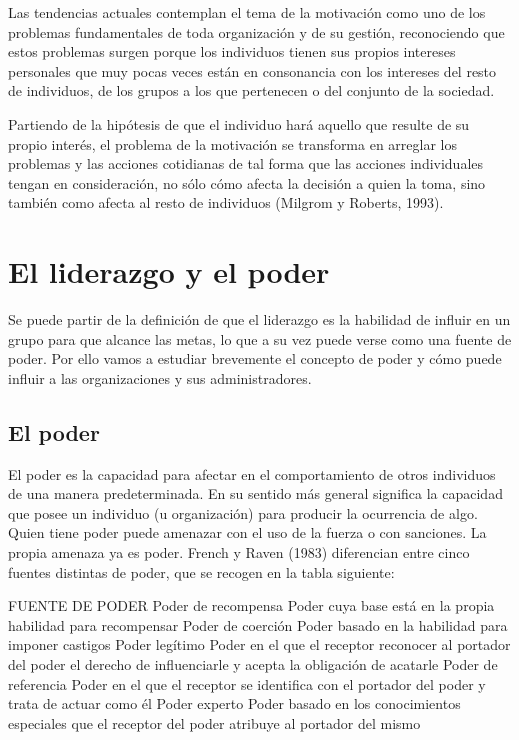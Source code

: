 \documentclass[
]{krantz}
\begin{document}
Las tendencias actuales contemplan el tema de la motivación como uno de los problemas fundamentales de toda organización y de su gestión, reconociendo que estos problemas surgen porque los individuos tienen sus propios intereses personales que muy pocas veces están en consonancia con los intereses del resto de individuos, de los grupos a los que pertenecen o del conjunto de la sociedad.

Partiendo de la hipótesis de que el individuo hará aquello que resulte de su propio interés, el problema de la motivación se transforma en arreglar los problemas y las acciones cotidianas de tal forma que las acciones individuales tengan en consideración, no sólo cómo afecta la decisión a quien la toma, sino también como afecta al resto de individuos (Milgrom y Roberts, 1993).

\hypertarget{el-liderazgo-y-el-poder}{%
\section{El liderazgo y el poder}\label{el-liderazgo-y-el-poder}}

Se puede partir de la definición de que el liderazgo es la habilidad de influir en un grupo para que alcance las metas, lo que a su vez puede verse como una fuente de poder. Por ello vamos a estudiar brevemente el concepto de poder y cómo puede influir a las organizaciones y sus administradores.

\hypertarget{el-poder}{%
\subsection{El poder}\label{el-poder}}

El poder es la capacidad para afectar en el comportamiento de otros individuos de una manera predeterminada. En su sentido más general significa la capacidad que posee un individuo (u organización) para producir la ocurrencia de algo. Quien tiene poder puede amenazar con el uso de la fuerza o con sanciones. La propia amenaza ya es poder.
French y Raven (1983) diferencian entre cinco fuentes distintas de poder, que se recogen en la tabla siguiente:

FUENTE DE PODER
Poder de recompensa Poder cuya base está en la propia habilidad para recompensar
Poder de coerción Poder basado en la habilidad para imponer castigos
Poder legítimo Poder en el que el receptor reconocer al portador del poder el derecho de influenciarle y acepta la obligación de acatarle
Poder de referencia Poder en el que el receptor se identifica con el portador del poder y trata de actuar como él
Poder experto Poder basado en los conocimientos especiales que el receptor del poder atribuye al portador del mismo
\end{document}
